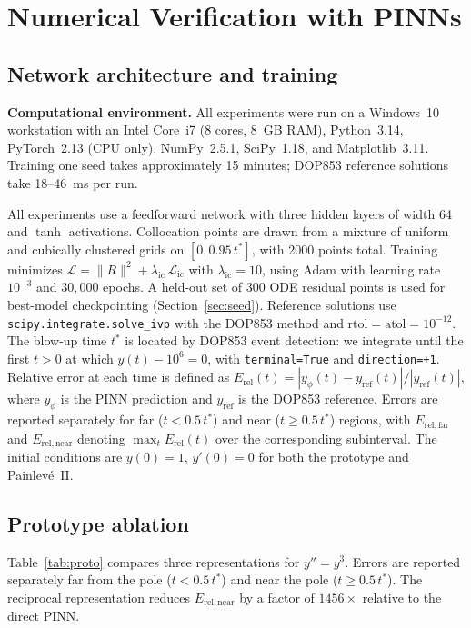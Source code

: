 \documentclass[a4paper, 10pt]{article}
\theoremstyle{definition}
\begin{document}
\section{Numerical Verification with PINNs}
\label{sec:numerics}

\subsection{Network architecture and training}

\noindent\textbf{Computational environment.} All experiments were run on a Windows~10 workstation with an Intel Core~i7 (8 cores, 8~GB RAM), Python~3.14, PyTorch~2.13 (CPU only), NumPy~2.5.1, SciPy~1.18, and Matplotlib~3.11. Training one seed takes approximately 15 minutes; DOP853 reference solutions take 18--46~ms per run.

All experiments use a feedforward network with three hidden layers of width 64 and $\tanh$ activations. Collocation points are drawn from a mixture of uniform and cubically clustered grids on $[0, 0.95\,t^*]$, with 2000 points total. Training minimizes $\mathcal{L} = \|R\|^2 + \lambda_{\mathrm{ic}}\,\mathcal{L}_{\mathrm{ic}}$ with $\lambda_{\mathrm{ic}} = 10$, using Adam with learning rate $10^{-3}$ and $30{,}000$ epochs. A held-out set of 300 ODE residual points is used for best-model checkpointing (Section~\ref{sec:seed}). Reference solutions use \texttt{scipy.integrate.solve\_ivp} with the DOP853 method and $\mathrm{rtol}=\mathrm{atol}=10^{-12}$. The blow-up time $t^*$ is located by DOP853 event detection: we integrate until the first $t>0$ at which $y(t) - 10^{6} = 0$, with \texttt{terminal=True} and \texttt{direction=+1}. Relative error at each time is defined as $E_{\mathrm{rel}}(t) = |y_\phi(t) - y_{\mathrm{ref}}(t)| / |y_{\mathrm{ref}}(t)|$, where $y_\phi$ is the PINN prediction and $y_{\mathrm{ref}}$ is the DOP853 reference. Errors are reported separately for far ($t < 0.5\,t^*$) and near ($t \ge 0.5\,t^*$) regions, with $E_{\mathrm{rel,far}}$ and $E_{\mathrm{rel,near}}$ denoting $\max_t E_{\mathrm{rel}}(t)$ over the corresponding subinterval. The initial conditions are $y(0)=1$, $y'(0)=0$ for both the prototype and Painlev\'e~II.

\subsection{Prototype ablation}
\label{sec:proto-ablation}

Table~\ref{tab:proto} compares three representations for $y''=y^3$. Errors are reported separately far from the pole ($t < 0.5\,t^*$) and near the pole ($t \ge 0.5\,t^*$). The reciprocal representation reduces $E_{\mathrm{rel,near}}$ by a factor of $1456\times$ relative to the direct PINN.
\end{document}
